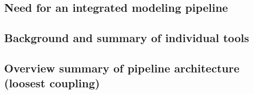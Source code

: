 \subsection{Need for an integrated modeling pipeline}
\subsection{Background and summary of individual tools}
\subsection{Overview summary of pipeline architecture (loosest coupling)}




